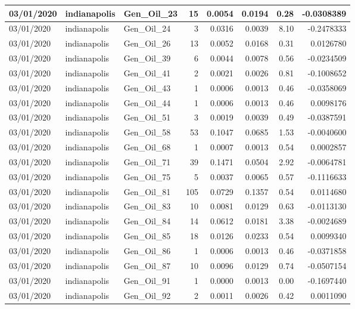 \documentclass[
  letterpaper,
  DIV=11,
  numbers=noendperiod]{scrartcl}
\begin{document}
\begin{tabular}{l|l|l|r|r|r|r|r}
\hline
03/01/2020 & indianapolis & Gen\_Oil\_23 & 15 & 0.0054 & 0.0194 & 0.28 & -0.0308389\\
\hline
03/01/2020 & indianapolis & Gen\_Oil\_24 & 3 & 0.0316 & 0.0039 & 8.10 & -0.2478333\\
\hline
03/01/2020 & indianapolis & Gen\_Oil\_26 & 13 & 0.0052 & 0.0168 & 0.31 & 0.0126780\\
\hline
03/01/2020 & indianapolis & Gen\_Oil\_39 & 6 & 0.0044 & 0.0078 & 0.56 & -0.0234509\\
\hline
03/01/2020 & indianapolis & Gen\_Oil\_41 & 2 & 0.0021 & 0.0026 & 0.81 & -0.1008652\\
\hline
03/01/2020 & indianapolis & Gen\_Oil\_43 & 1 & 0.0006 & 0.0013 & 0.46 & -0.0358069\\
\hline
03/01/2020 & indianapolis & Gen\_Oil\_44 & 1 & 0.0006 & 0.0013 & 0.46 & 0.0098176\\
\hline
03/01/2020 & indianapolis & Gen\_Oil\_51 & 3 & 0.0019 & 0.0039 & 0.49 & -0.0387591\\
\hline
03/01/2020 & indianapolis & Gen\_Oil\_58 & 53 & 0.1047 & 0.0685 & 1.53 & -0.0040600\\
\hline
03/01/2020 & indianapolis & Gen\_Oil\_68 & 1 & 0.0007 & 0.0013 & 0.54 & 0.0002857\\
\hline
03/01/2020 & indianapolis & Gen\_Oil\_71 & 39 & 0.1471 & 0.0504 & 2.92 & -0.0064781\\
\hline
03/01/2020 & indianapolis & Gen\_Oil\_75 & 5 & 0.0037 & 0.0065 & 0.57 & -0.1116633\\
\hline
03/01/2020 & indianapolis & Gen\_Oil\_81 & 105 & 0.0729 & 0.1357 & 0.54 & 0.0114680\\
\hline
03/01/2020 & indianapolis & Gen\_Oil\_83 & 10 & 0.0081 & 0.0129 & 0.63 & -0.0113130\\
\hline
03/01/2020 & indianapolis & Gen\_Oil\_84 & 14 & 0.0612 & 0.0181 & 3.38 & -0.0024689\\
\hline
03/01/2020 & indianapolis & Gen\_Oil\_85 & 18 & 0.0126 & 0.0233 & 0.54 & 0.0099340\\
\hline
03/01/2020 & indianapolis & Gen\_Oil\_86 & 1 & 0.0006 & 0.0013 & 0.46 & -0.0371858\\
\hline
03/01/2020 & indianapolis & Gen\_Oil\_87 & 10 & 0.0096 & 0.0129 & 0.74 & -0.0507154\\
\hline
03/01/2020 & indianapolis & Gen\_Oil\_91 & 1 & 0.0000 & 0.0013 & 0.00 & -0.1697440\\
\hline
03/01/2020 & indianapolis & Gen\_Oil\_92 & 2 & 0.0011 & 0.0026 & 0.42 & 0.0011090\\

\end{tabular}
\end{document}
